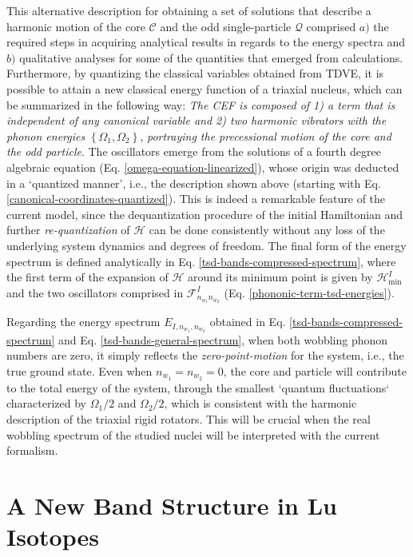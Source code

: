 This alternative description for obtaining a set of solutions that describe a harmonic motion of the core $\mathscr{C}$ and the odd single-particle $\mathcal{Q}$ comprised $a)$ the required steps in acquiring analytical results in regards to the energy spectra and $b)$ qualitative analyses for some of the quantities that emerged from calculations. Furthermore, by quantizing the classical variables obtained from TDVE, it is possible to attain a new classical energy function of a triaxial nucleus, which can be summarized in the following way: \emph{The CEF is composed of 1) a term that is independent of any canonical variable and 2) two harmonic vibrators with the phonon energies} $\left\{\Omega_1,\Omega_2\right\}$, \emph{portraying the precessional motion of the core and the odd particle}. The oscillators emerge from the solutions of a fourth degree algebraic equation (Eq. \ref{omega-equation-linearized}), whose origin was deducted in a `quantized manner', i.e., the description shown above (starting with Eq. \ref{canonical-coordinates-quantized}). This is indeed a remarkable feature of the current model, since the dequantization procedure of the initial Hamiltonian and further \emph{re-quantization} of $\mathcal{H}$ can be done consistently without any loss of the underlying system dynamics and degrees of freedom. The final form of the energy spectrum is defined analytically in Eq. \ref{tsd-bands-compressed-spectrum}, where the first term of the expansion of $\mathcal{H}$ around its minimum point is given by $\mathcal{H}_\text{min}^I$ and the two oscillators comprised in $\mathcal{F}_{n_{w_1}n_{w_2}}^I$ (Eq. \ref{phononic-term-tsd-energies}).

Regarding the energy spectrum $E_{I,n_{w_1},n_{w_2}}$ obtained in Eq. \ref{tsd-bands-compressed-spectrum} and Eq. \ref{tsd-bands-general-spectrum}, when both wobbling phonon numbers are zero, it simply reflects the \emph{zero-point-motion} for the system, i.e., the true ground state. Even when $n_{w_1}=n_{w_2}=0$, the core and particle will contribute to the total energy of the system, through the smallest `quantum fluctuations` characterized by $\Omega_1/2$ and $\Omega_2/2$, which is consistent with the harmonic description of the triaxial rigid rotators. This will be crucial when the real wobbling spectrum of the studied nuclei will be interpreted with the current formalism.

\section{A New Band Structure in Lu Isotopes}

